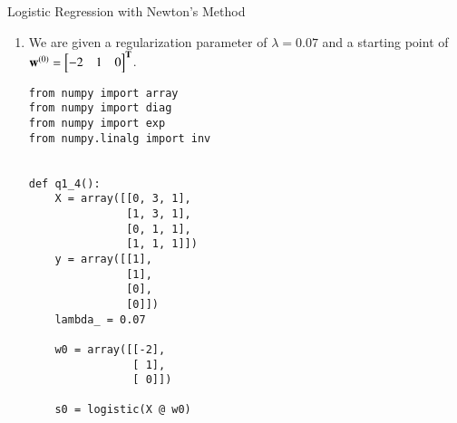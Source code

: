 \documentclass[section]{problemset}
\begin{document}
\begin{problem}{Logistic Regression with Newton's Method}
\begin{enumerate}
\begin{mdframed}
The quadratic approximation to the cost function at $\v$ is
\begin{align*}
  q(\w)
  &= J(\v) + (\w - \v)^\T\(\grad J(\v)\) + \frac{1}{2}(\w - \v)^\T \(\hess J(\v)\) (\w - \v).
\end{align*}
We want to find the $\w$ that minimizes this. The gradient of this is something
like
\begin{align*}
  \grad q(\w) = \grad J(\v) + \(\hess J(\v)\)\w,
\end{align*}
but that's not quite right. Anyway, from the lecture notes, setting the
gradient equal to zero gives
\begin{align*}
  \w = \v -\(\hess J(\v)\)^{-1} \grad J(\v).
\end{align*}
For our problem, this is (writing $\w^{(l)}$ instead of $\v$ for the value of $\w$ at iteration $l$.)
\begin{align*}
  \w^{(l+1)} = \w^{(l)} -\(\X^\T\B\X\)^{-1} \(2\lambda\w^{(l)} - \X^\T\(\y - s(\X\w^{(l)})\)\),
\end{align*}
where again $\B$ is an $(n \times n)$ diagonal matrix with
$B_{ii} = s_i(\w^{(l)})\(1-s_i(\w^{(l)})\) + 2\lambda$
\end{mdframed}


\item
We are given a regularization parameter of $\lambda = 0.07$ and
a starting point of $\mathbf w^{(0)} = \begin{bmatrix} -2 & 1 & 0 \end{bmatrix}^{\mathbf{T}}$.
\begin{mdframed}
  \begin{verbatim}
from numpy import array
from numpy import diag
from numpy import exp
from numpy.linalg import inv


def q1_4():
    X = array([[0, 3, 1],
               [1, 3, 1],
               [0, 1, 1],
               [1, 1, 1]])
    y = array([[1],
               [1],
               [0],
               [0]])
    lambda_ = 0.07

    w0 = array([[-2],
                [ 1],
                [ 0]])

    s0 = logistic(X @ w0)


\end{verbatim}
\end{mdframed}
\end{enumerate}
\end{problem}
\end{document}
